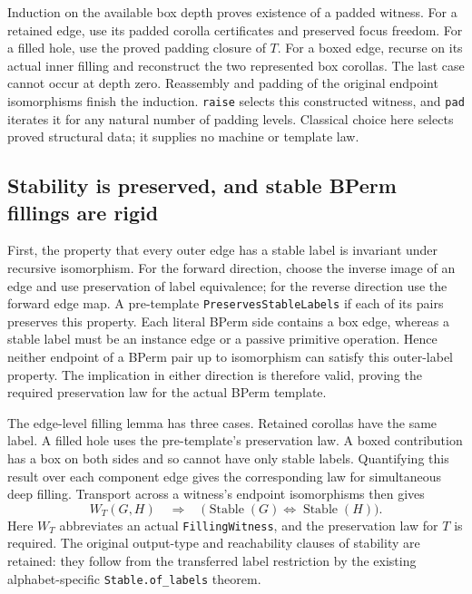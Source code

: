 
Induction on the available box depth proves existence of a padded witness.
For a retained edge, use its padded corolla certificates and preserved focus
freedom. For a filled hole, use the proved padding closure of $T$. For a boxed
edge, recurse on its actual inner filling and reconstruct the two represented
box corollas. The last case cannot occur at depth zero. Reassembly and padding
of the original endpoint isomorphisms finish the induction.
\texttt{raise} selects this constructed witness, and \texttt{pad} iterates it
for any natural number of padding levels. Classical choice here selects
proved structural data; it supplies no machine or template law.


\subsection{Stability is preserved, and stable BPerm fillings are rigid}
First, the property that every outer edge has a stable label is invariant
under recursive isomorphism. For the forward direction, choose the inverse
image of an edge and use preservation of label equivalence; for the reverse
direction use the forward edge map. A pre-template
\texttt{PreservesStableLabels} if each of its pairs preserves this property.
Each literal BPerm side contains a box edge, whereas a stable label must be
an instance edge or a passive primitive operation. Hence neither endpoint
of a BPerm pair up to isomorphism can satisfy this outer-label property.
The implication in either direction is therefore valid, proving the required
preservation law for the actual BPerm template.


The edge-level filling lemma has three cases. Retained corollas have the same
label. A filled hole uses the pre-template's preservation law. A boxed
contribution has a box on both sides and so cannot have only stable labels.
Quantifying this result over each component edge gives the corresponding
law for simultaneous deep filling. Transport across a witness's endpoint
isomorphisms then gives
\[
 W_T(G,H)\quad\Longrightarrow\quad
   \bigl(\operatorname{Stable}(G)\iff\operatorname{Stable}(H)\bigr).
\]
Here $W_T$ abbreviates an actual \texttt{FillingWitness}, and the preservation
law for $T$ is required. The original output-type and reachability clauses of
stability are retained: they follow from the transferred label restriction
by the existing alphabet-specific \texttt{Stable.of\_labels} theorem.

